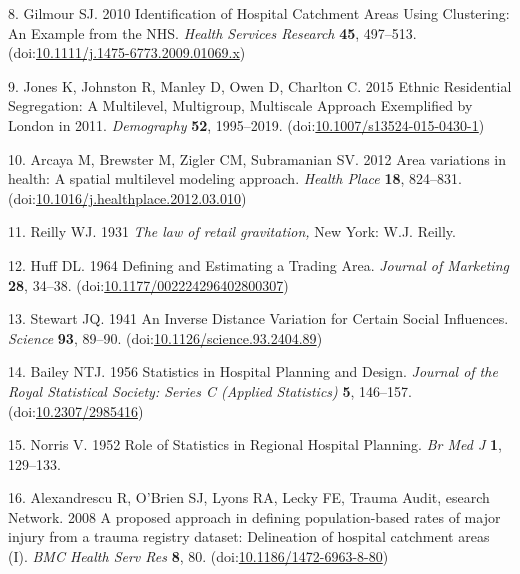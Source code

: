 \documentclass[
]{article}
\begin{document}
\leavevmode\hypertarget{ref-gilmourIdentificationHospitalCatchment2010}{}%
8. Gilmour SJ. 2010 Identification of Hospital Catchment Areas Using
Clustering: An Example from the NHS. \emph{Health Services Research}
\textbf{45}, 497--513.
(doi:\href{https://doi.org/10.1111/j.1475-6773.2009.01069.x}{10.1111/j.1475-6773.2009.01069.x})

\leavevmode\hypertarget{ref-jonesEthnicResidentialSegregation2015}{}%
9. Jones K, Johnston R, Manley D, Owen D, Charlton C. 2015 Ethnic
Residential Segregation: A Multilevel, Multigroup, Multiscale Approach
Exemplified by London in 2011. \emph{Demography} \textbf{52},
1995--2019.
(doi:\href{https://doi.org/10.1007/s13524-015-0430-1}{10.1007/s13524-015-0430-1})

\leavevmode\hypertarget{ref-arcayaAreaVariationsHealth2012}{}%
10. Arcaya M, Brewster M, Zigler CM, Subramanian SV. 2012 Area
variations in health: A spatial multilevel modeling approach.
\emph{Health Place} \textbf{18}, 824--831.
(doi:\href{https://doi.org/10.1016/j.healthplace.2012.03.010}{10.1016/j.healthplace.2012.03.010})

\leavevmode\hypertarget{ref-reillyLawRetailGravitation1931}{}%
11. Reilly WJ. 1931 \emph{The law of retail gravitation,} New York: W.J.
Reilly.

\leavevmode\hypertarget{ref-huffDefiningEstimatingTrading1964}{}%
12. Huff DL. 1964 Defining and Estimating a Trading Area. \emph{Journal
of Marketing} \textbf{28}, 34--38.
(doi:\href{https://doi.org/10.1177/002224296402800307}{10.1177/002224296402800307})

\leavevmode\hypertarget{ref-stewartInverseDistanceVariation1941}{}%
13. Stewart JQ. 1941 An Inverse Distance Variation for Certain Social
Influences. \emph{Science} \textbf{93}, 89--90.
(doi:\href{https://doi.org/10.1126/science.93.2404.89}{10.1126/science.93.2404.89})

\leavevmode\hypertarget{ref-baileyStatisticsHospitalPlanning1956}{}%
14. Bailey NTJ. 1956 Statistics in Hospital Planning and Design.
\emph{Journal of the Royal Statistical Society: Series C (Applied
Statistics)} \textbf{5}, 146--157.
(doi:\href{https://doi.org/10.2307/2985416}{10.2307/2985416})

\leavevmode\hypertarget{ref-norrisRoleStatisticsRegional1952}{}%
15. Norris V. 1952 Role of Statistics in Regional Hospital Planning.
\emph{Br Med J} \textbf{1}, 129--133.

\leavevmode\hypertarget{ref-alexandrescuProposedApproachDefining2008}{}%
16. Alexandrescu R, O'Brien SJ, Lyons RA, Lecky FE, Trauma Audit,
esearch Network. 2008 A proposed approach in defining population-based
rates of major injury from a trauma registry dataset: Delineation of
hospital catchment areas (I). \emph{BMC Health Serv Res} \textbf{8}, 80.
(doi:\href{https://doi.org/10.1186/1472-6963-8-80}{10.1186/1472-6963-8-80})
\end{document}

